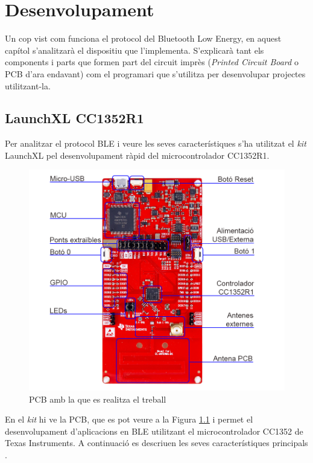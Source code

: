 \chapter{Desenvolupament}
Un cop vist com funciona el protocol del Bluetooth Low Energy, en aquest capítol s'analitzarà el dispositiu que l'implementa.
S'explicarà tant els components i parts que formen part del circuit imprès (\textit{Printed Circuit Board} o PCB d'ara endavant) com el programari que s'utilitza per desenvolupar projectes utilitzant-la.

\section{LaunchXL CC1352R1}
Per analitzar el protocol BLE i veure les seves característiques s'ha utilitzat el \textit{kit} LaunchXL pel desenvolupament ràpid del microcontrolador CC1352R1.

\begin{figure}[h!]
	\begin{center}
		\includegraphics[width=\textwidth]{./images/launchxl-cc1352r1.png}
		\caption{PCB amb la que es realitza el treball \cite{placa}}
		\label{PCB}
	\end{center}
\end{figure}

En el \textit{kit} hi ve la PCB, que es pot veure a la Figura \ref{PCB} i permet el desenvolupament d'aplicacions en BLE utilitzant el microcontrolador CC1352 de Texas Instruments.
A continuació es descriuen les seves característiques principals \cite{placa_datasheet}.

